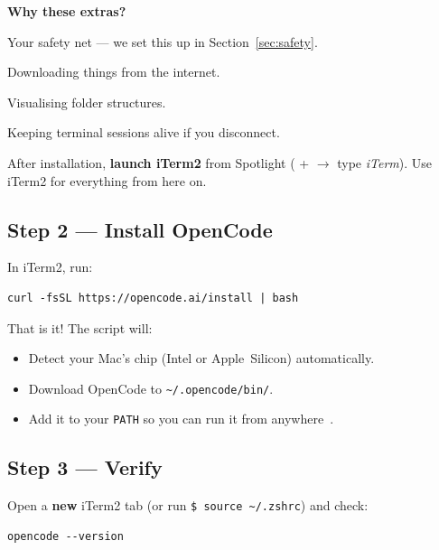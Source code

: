 \documentclass[12pt]{article}
\newcommand{\cmd}[1]{\texttt{\$ #1}}
\newcommand{\key}[1]{\keystroke{#1}}
\newcommand{\keystroke}[1]{%
  \tikz[baseline=(key.base)]{%
    \node[draw, rounded corners=2pt, inner sep=2pt, fill=gray!10,
          font=\ttfamily\small] (key) {#1};%
  }%
}
\begin{document}
\begin{ex-box}
\textbf{Why these extras?}
\begin{description}[nosep, leftmargin=1.6cm]
  \item[\texttt{git}] Your safety net --- we set this up in Section~\ref{sec:safety}.
  \item[\texttt{curl}/\texttt{wget}] Downloading things from the internet.
  \item[\texttt{tree}] Visualising folder structures.
  \item[\texttt{tmux}] Keeping terminal sessions alive if you disconnect.
\end{description}
\end{ex-box}

After installation, \textbf{launch iTerm2} from Spotlight (\key{Cmd}+\key{Space} $\to$ type \emph{iTerm}).  Use iTerm2 for everything from here on.

\subsection{Step 2 --- Install OpenCode}

In iTerm2, run:

\begin{lstlisting}[style=term]
curl -fsSL https://opencode.ai/install | bash
\end{lstlisting}

That is it!  The script will:
\begin{itemize}[nosep]
  \item[\faCheckCircle] Detect your Mac's chip (Intel or Apple~Silicon) automatically.
  \item[\faCheckCircle] Download OpenCode to \texttt{\textasciitilde/.opencode/bin/}.
  \item[\faCheckCircle] Add it to your \texttt{PATH} so you can run it from anywhere~\cite{opencode_install2026}.
\end{itemize}

\subsection{Step 3 --- Verify}

Open a \textbf{new} iTerm2 tab (or run \cmd{source \textasciitilde/.zshrc}) and check:

\begin{lstlisting}[style=term]
opencode --version
\end{lstlisting}
\end{document}
